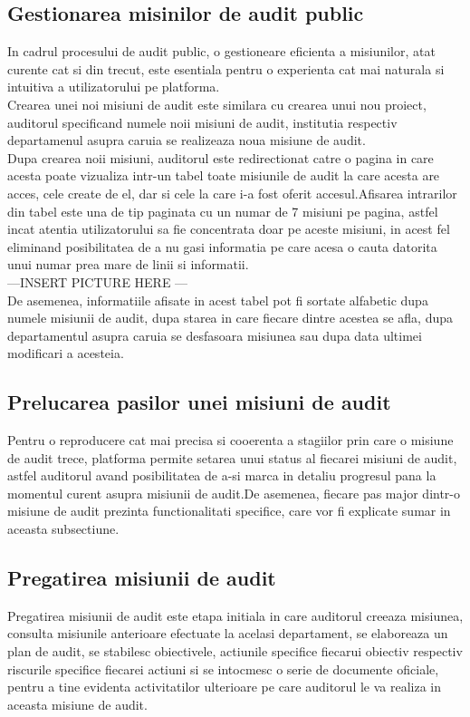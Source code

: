 \subsection{Gestionarea misinilor de audit public}
In cadrul procesului de audit public, o gestioneare eficienta a misiunilor, atat curente cat si din trecut, este esentiala pentru o experienta cat mai naturala si intuitiva a utilizatorului pe platforma.\\
Crearea unei noi misiuni de audit este similara cu crearea unui nou proiect, auditorul specificand numele noii misiuni de audit, institutia respectiv departamenul asupra caruia se realizeaza noua misiune de audit. \\
Dupa crearea noii misiuni, auditorul este redirectionat catre o pagina in care acesta poate vizualiza intr-un tabel toate misiunile de audit la care acesta are acces, cele create de el, dar si cele la care i-a fost oferit accesul.Afisarea intrarilor din tabel este una de tip paginata cu un numar de 7 misiuni pe pagina, astfel incat atentia utilizatorului sa fie concentrata doar pe aceste misiuni, in acest fel eliminand posibilitatea de a nu gasi informatia pe care acesa o cauta datorita unui numar prea mare de linii si informatii.\\
---INSERT PICTURE HERE ---\\
De asemenea, informatiile afisate in acest tabel pot fi sortate alfabetic dupa numele misiunii de audit, dupa starea in care fiecare dintre acestea se afla, dupa departamentul asupra caruia se desfasoara misiunea  sau dupa data ultimei modificari a acesteia.

\subsection{Prelucarea pasilor unei misiuni de audit}
Pentru o reproducere cat mai precisa si cooerenta a stagiilor prin care o misiune de audit trece, platforma permite setarea unui status al fiecarei misiuni de audit, astfel auditorul avand posibilitatea de a-si marca in detaliu progresul pana la momentul curent asupra misiunii de audit.De asemenea, fiecare pas major dintr-o misiune de audit prezinta functionalitati specifice, care vor fi explicate sumar in aceasta subsectiune.

\subsection*{Pregatirea misiunii de audit}
Pregatirea misiunii de audit este etapa initiala in care auditorul creeaza misiunea, consulta misiunile anterioare efectuate la acelasi departament, se elaboreaza un plan de audit, se stabilesc obiectivele, actiunile specifice fiecarui obiectiv respectiv riscurile specifice fiecarei actiuni si se intocmesc o serie de documente oficiale, pentru a tine evidenta activitatilor ulterioare pe care auditorul le va realiza in aceasta misiune de audit.

